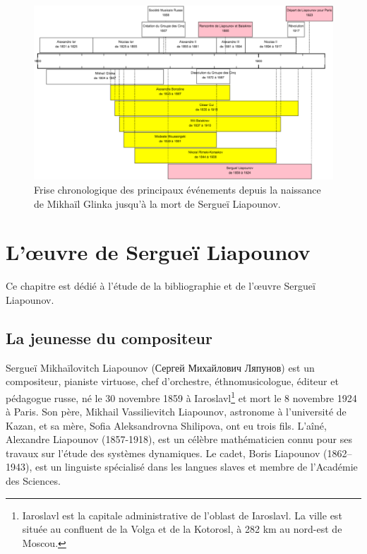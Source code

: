 \begin{figure}[!ht]
  \begin{bigcenter}
    \includegraphics[width=17.5cm, keepaspectratio]{frise.png}
  \end{bigcenter}
  \caption{\label{frise}Frise chronologique des principaux événements depuis la naissance de Mikhaïl Glinka jusqu'à la mort de Sergueï Liapounov.}
\end{figure}


\chapter{L'œuvre de Sergueï Liapounov}

Ce chapitre est dédié à l'étude de la bibliographie et de l'œuvre Sergueï Liapounov.

\section{La jeunesse du compositeur}

Sergueï Mikhaïlovitch Liapounov (\foreignlanguage{russian}{Сергей Михайлович Ляпунов}) est un compositeur, pianiste virtuose, chef d'orchestre, éthnomusicologue, éditeur et pédagogue russe, né le 30 novembre 1859 à Iaroslavl\footnote{Iaroslavl est la capitale administrative de l'oblast de Iaroslavl. La ville est située au confluent de la Volga et de la Kotorosl, à 282 km au nord-est de Moscou.} et mort le 8 novembre 1924 à Paris. Son père, Mikhail Vassilievitch Liapounov, astronome à l'université de Kazan, et sa mère, Sofia Aleksandrovna Shilipova, ont eu trois fils. L'aîné, Alexandre Liapounov (1857-1918), est un célèbre mathématicien connu pour ses travaux sur l'étude des systèmes dynamiques. Le cadet, Boris Liapounov (1862–1943), est un linguiste spécialisé dans les langues slaves et membre de l'Académie des Sciences.

